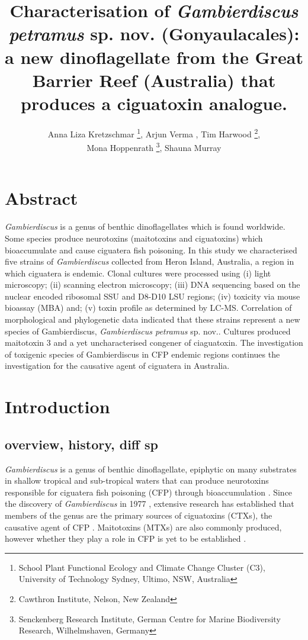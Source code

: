 \documentclass[12pt]{article}
\title{Characterisation of \emph{Gambierdiscus petramus} sp. nov. (Gonyaulacales): a new dinoflagellate from the Great Barrier Reef (Australia) that produces a ciguatoxin analogue.}
\author{Anna Liza Kretzschmar \thanks{School Plant Functional Ecology and Climate Change Cluster (C3), University of Technology Sydney, Ultimo, NSW, Australia}, Arjun Verma \footnotemark[1], Tim Harwood \thanks{Cawthron Institute, Nelson, New Zealand},\\
Mona Hoppenrath \thanks{Senckenberg Research Institute, German Centre for Marine Biodiversity Research, Wilhelmshaven, Germany}, Shauna Murray \footnotemark[1]}
\date{}
\begin{document}
\maketitle
\newpage
\section{Abstract}
\textit{Gambierdiscus} is a genus of benthic dinoflagellates which is found worldwide. Some species produce neurotoxins (maitotoxins and ciguatoxins) which  bioaccumulate and cause ciguatera fish poisoning. In this study we characterised five strains of \textit{Gambierdiscus} collected from Heron Island,  Australia, a region in which ciguatera is endemic. Clonal cultures were processed using (i) light microscopy; (ii) scanning electron microscopy; (iii) DNA sequencing based on the nuclear encoded ribosomal  SSU and D8-D10 LSU regions; (iv) toxicity via mouse bioassay (MBA) and; (v) toxin profile as determined by LC-MS. Correlation of morphological and phylogenetic data indicated that these strains represent a new species of Gambierdiscus, \emph{Gambierdiscus petramus} sp. nov.. Cultures produced maitotoxin 3 and a yet uncharacterised congener of ciaguatoxin. The investigation of toxigenic species of Gambierdiscus in CFP endemic regions continues the investigation for the causative agent of ciguatera in Australia.
\newpage

\section{Introduction}


\subsection{overview, history, diff sp}
\emph{Gambierdiscus} is a genus of benthic dinoflagellate, epiphytic on many substrates in shallow tropical and sub-tropical waters that can produce neurotoxins responsible for ciguatera fish poisoning (CFP) through bioaccumulation \cite{berdalet2012global}. 
Since the discovery of \emph{Gambierdiscus} in 1977 \cite{yasumoto1977finding}, extensive research has established that members of the genus are the primary sources of ciguatoxins (CTXs), the causative agent of CFP \cite{chinain1997intraspecific,holmes1998gambierdiscus}. Maitotoxins (MTXs) are also commonly produced, however whether they play a role in CFP is yet to be established \cite{kohli2014feeding}. 
\end{document}

